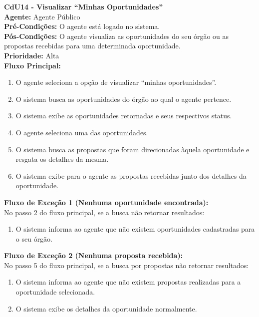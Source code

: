 
\vspace{7pt}
\noindent\textbf{\normalsize CdU14 - Visualizar ``Minhas Oportunidades''}\\
\noindent\textbf{Agente:} Agente Público\\ 
\textbf{Pré-Condições:} O agente está logado no sistema.\\ 
\textbf{Pós-Condições:} O agente visualiza as oportunidades do seu órgão ou as propostas recebidas para uma determinada oportunidade.\\
\textbf{Prioridade:} Alta \vspace{3pt}\\
\noindent\textbf{Fluxo Principal:}
\begin{enumerate}[noitemsep, topsep=-5pt, parsep=0pt]
    \item O agente seleciona a opção de visualizar ``minhas oportunidades''.
    \item O sistema busca as oportunidades do órgão ao qual o agente pertence.
    \item O sistema exibe as oportunidades retornadas e seus respectivos status.
    \item O agente seleciona uma das oportunidades.
    \item O sistema busca as propostas que foram direcionadas àquela oportunidade e resgata os detalhes da mesma.
    \item O sistema exibe para o agente as propostas recebidas junto dos detalhes da oportunidade.
\end{enumerate}

\noindent\textbf{Fluxo de Exceção 1 (Nenhuma oportunidade encontrada):}\\
No passo 2 do fluxo principal, se a busca não retornar resultados:
\begin{enumerate}[noitemsep, topsep=-5pt, parsep=0pt]
    \item O sistema informa ao agente que não existem oportunidades cadastradas para o seu órgão.
\end{enumerate}

\noindent\textbf{Fluxo de Exceção 2 (Nenhuma proposta recebida):}\\
No passo 5 do fluxo principal, se a busca por propostas não retornar resultados:
\begin{enumerate}[noitemsep, topsep=-5pt, parsep=0pt]
    \item O sistema informa ao agente que não existem propostas realizadas para a oportunidade selecionada.
    \item O sistema exibe os detalhes da oportunidade normalmente.
\end{enumerate}

